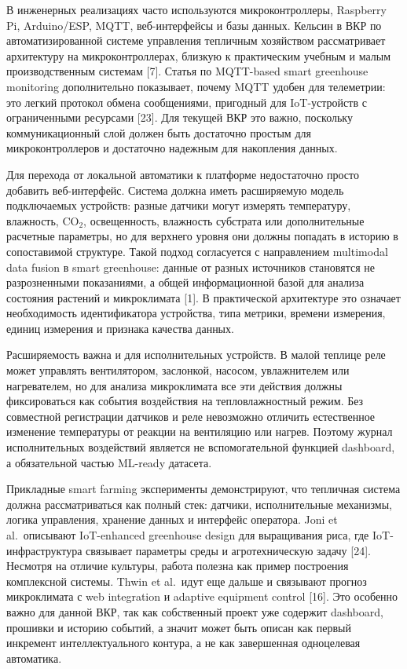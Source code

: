 \documentclass[a4paper,14pt]{extarticle}
\begin{document}
В инженерных реализациях часто используются микроконтроллеры, Raspberry
Pi, Arduino/ESP, MQTT, веб-интерфейсы и базы данных. Кельсин в ВКР по
автоматизированной системе управления тепличным хозяйством рассматривает
архитектуру на микроконтроллерах, близкую к практическим учебным и малым
производственным системам {[}7{]}. Статья по MQTT-based smart greenhouse
monitoring дополнительно показывает, почему MQTT удобен для телеметрии:
это легкий протокол обмена сообщениями, пригодный для IoT-устройств с
ограниченными ресурсами {[}23{]}. Для текущей ВКР это важно, поскольку
коммуникационный слой должен быть достаточно простым для
микроконтроллеров и достаточно надежным для накопления данных.

Для перехода от локальной автоматики к платформе недостаточно просто
добавить веб-интерфейс. Система должна иметь расширяемую модель
подключаемых устройств: разные датчики могут измерять температуру,
влажность, CO\(_2\), освещенность, влажность субстрата или
дополнительные расчетные параметры, но для верхнего уровня они должны
попадать в историю в сопоставимой структуре. Такой подход согласуется с
направлением multimodal data fusion в smart greenhouse: данные от разных
источников становятся не разрозненными показаниями, а общей
информационной базой для анализа состояния растений и микроклимата
{[}1{]}. В практической архитектуре это означает необходимость
идентификатора устройства, типа метрики, времени измерения, единиц
измерения и признака качества данных.

Расширяемость важна и для исполнительных устройств. В малой теплице реле
может управлять вентилятором, заслонкой, насосом, увлажнителем или
нагревателем, но для анализа микроклимата все эти действия должны
фиксироваться как события воздействия на тепловлажностный режим. Без
совместной регистрации датчиков и реле невозможно отличить естественное
изменение температуры от реакции на вентиляцию или нагрев. Поэтому
журнал исполнительных воздействий является не вспомогательной функцией
dashboard, а обязательной частью ML-ready датасета.

Прикладные smart farming эксперименты демонстрируют, что тепличная
система должна рассматриваться как полный стек: датчики, исполнительные
механизмы, логика управления, хранение данных и интерфейс оператора.
Joni et al.~описывают IoT-enhanced greenhouse design для выращивания
риса, где IoT-инфраструктура связывает параметры среды и агротехническую
задачу {[}24{]}. Несмотря на отличие культуры, работа полезна как пример
построения комплексной системы. Thwin et al.~идут еще дальше и связывают
прогноз микроклимата с web integration и adaptive equipment control
{[}16{]}. Это особенно важно для данной ВКР, так как собственный проект
уже содержит dashboard, прошивки и историю событий, а значит может быть
описан как первый инкремент интеллектуального контура, а не как
завершенная одноцелевая автоматика.
\end{document}
